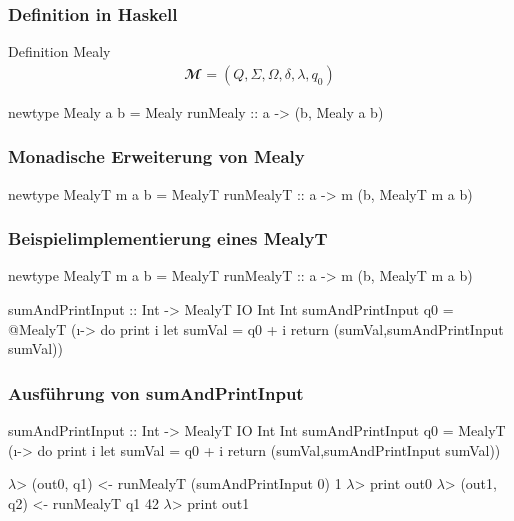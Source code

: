 \begin{frame}[fragile]
  \frametitle{Definition in Haskell}
  \begin{block}{Definition Mealy}
    \begin{align*}
    \mathbfcal{M} = \left( Q, \Sigma, \Omega, \delta, \lambda, q_0 \right)
    \label{def:mealy-formal}
  \end{align*}
  \end{block}
  \begin{haskell}[label={lst:haskell-mealy},caption={[Definition Mealy in Haskell]Definition Mealy in Haskell\protect\footnotemark}]
newtype Mealy a b = Mealy {
  runMealy :: a -> (b, Mealy a b)
}
  \end{haskell}
\end{frame}

\begin{frame}[fragile]
  \frametitle{Monadische Erweiterung von {\ttfamily Mealy}}
  \begin{haskell}[label={lst:haskell-mealy},caption={[Monadische Mealy]Monadische Mealy}]
newtype MealyT m a b = MealyT {
  runMealyT :: a -> m (b, MealyT m a b)
}
  \end{haskell}
\end{frame}

\begin{frame}[fragile]
  \frametitle{Beispielimplementierung eines {\ttfamily MealyT}}

  \begin{haskell}[label={lst:haskell-mealy}]
newtype MealyT m a b = MealyT {
  runMealyT :: a -> m (b, MealyT m a b)
}
  \end{haskell}

  \begin{haskell}
sumAndPrintInput :: Int -> MealyT IO Int Int
sumAndPrintInput q0 = @\pause@ MealyT (\i -> do
  print i
  let sumVal = q0 + i
  return (sumVal,sumAndPrintInput sumVal))
  \end{haskell}
\end{frame}

\begin{frame}[fragile]
  \frametitle{Ausführung von {\ttfamily sumAndPrintInput}}

  \begin{haskell}
sumAndPrintInput :: Int -> MealyT IO Int Int
sumAndPrintInput q0 = MealyT (\i -> do
  print i
  let sumVal = q0 + i
  return (sumVal,sumAndPrintInput sumVal))
  \end{haskell}
  \begin{semiverbatim}
\(\lambda\)> (out0, q1) <- runMealyT (sumAndPrintInput 0) 1\pause
\(\lambda\)> print out0 \pause
\(\lambda\)> (out1, q2) <- runMealyT q1 42\pause
\(\lambda\)> print out1
  \end{semiverbatim}
\end{frame}

